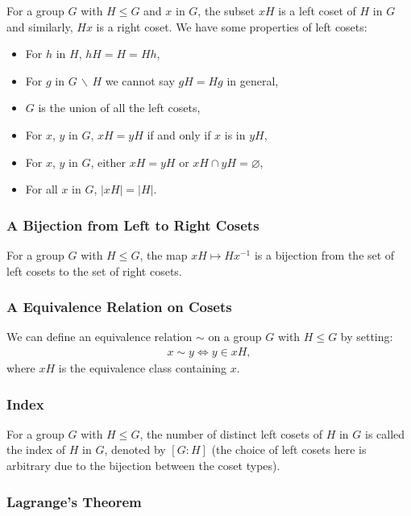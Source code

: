 For a group $G$ with $H \leq G$ and $x$ in $G$, the subset $xH$ is a left
coset of $H$ in $G$ and similarly, $Hx$ is a right coset. We have
some properties of left cosets: \begin{itemize}
    \item For $h$ in $H$, $hH = H = Hh$,
    \item For $g$ in $G \, \backslash \, H$ we cannot say $gH = Hg$ in general,
    \item $G$ is the union of all the left cosets,
    \item For $x$, $y$ in $G$, $xH = yH$ if and only if $x$ is in $yH$,
    \item For $x$, $y$ in $G$, either $xH = yH$ or $xH \cap yH = \varnothing$,
    \item For all $x$ in $G$, $|xH| = |H|$.
\end{itemize}

\subsubsection{A Bijection from Left to Right Cosets}

For a group $G$ with $H \leq G$, the map $xH \mapsto Hx^{-1}$ is a 
bijection from the set of left cosets to the set of right cosets.

\subsubsection{A Equivalence Relation on Cosets}

We can define an equivalence relation $\sim$ on a group $G$ with $H \leq G$ 
by setting: \begin{align*}
    x \sim y \Longleftrightarrow y \in xH,
\end{align*} where $xH$ is the equivalence class containing $x$.

\subsubsection{Index}

For a group $G$ with $H \leq G$, the number of distinct left cosets of $H$
in $G$ is called the index of $H$ in $G$, denoted by $[G : H]$ (the choice
of left cosets here is arbitrary due to the bijection between the coset types).

\subsubsection{Lagrange's Theorem}

